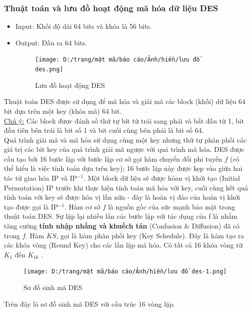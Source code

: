 \subsubsection{Thuật toán và lưu đồ hoạt động mã hóa dữ liệu DES}
\begin{itemize}
    \item Input: Khối độ dài 64 bits và khóa là 56 bits.
    \item Output: Đầu ra 64 bits.
    \begin{figure}[H]
        \centering
        \texttt{[image: D:/trang/mật mã/báo cáo/Ảnh/hiền/lưu đồ des.png]}
        \caption{Lưu đồ hoạt động DES}
    \end{figure}
\end{itemize}
Thuật toán DES được sử dụng để mã hóa và giải mã các block (khối) dữ liệu 64 bit dựa trên một key (khóa mã) 64 bit.\\
\underline{Chú ý:}  Các block được đánh số thứ tự bít từ trái sang phải và bắt đầu từ 1, bit đầu tiên bên trái là bit số 1 và bit cuối cùng bên phải là bit số 64.\\
\indent Quá trình giải mã và mã hóa sử dụng cùng một key nhưng thứ tự phân phối các giá trị các bit key của quá trình giải mã ngược với quá trình mã hóa.
DES được cấu tạo bởi 16 bước lặp với bước lặp cơ sở gọi hàm chuyển đổi phi tuyến $f$ (có thể hiểu là việc tính toán dựa trên key); 16 bước lặp này được kẹp vào giữa hai tác tử giao hóa IP và IP$^{-1}$. Một block dữ liệu sẽ được hóan vị khởi tạo (Initial Permutation) IP trước khi thực hiện tính toán mã hóa với key, cuối cùng kết quả tính toán với key sẽ được hóa vị lần nữa - đây là hoán vị đảo của hoán vị khởi tạo được gọi là IP$^{-1}$. Hàm cơ sở $f$ là nguồn gốc của sức mạnh bảo mật trong thuật toán DES. Sự lặp lại nhiều lần các bước lặp với tác dụng của f là nhằm tăng cường \textbf{tính nhập nhằng và khuếch tán} (Confusion \& Diffusion) đã có trong $f$.
Hàm $KS$, gọi là hàm phân phối key (Key Schedule). Đây là hàm tạo ra các khóa vòng (Round Key) cho các lần lặp mã hóa. Có tất cả 16 khóa vòng từ $K_1$ đến $K_{16}$ \cite{Khanh2014}.
\begin{figure}[H]
    \centering
    \texttt{[image: D:/trang/mật mã/báo cáo/Ảnh/hiền/lưu đồ des-1.png]}
    \caption{Sơ đồ sinh mã DES}
\end{figure}
Trên đây là sơ đồ sinh mã DES với cấu trúc 16 vòng lặp.
